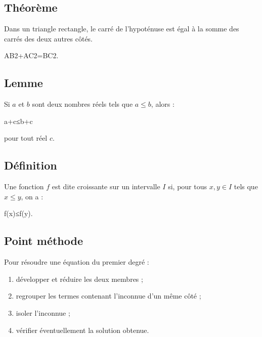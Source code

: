 \subsection{Théorème}

\begin{theoremebox}
Dans un triangle rectangle, le carré de l'hypoténuse est égal à la somme des carrés des deux autres côtés.

AB2+AC2=BC2.

\end{theoremebox}


\subsection{Lemme}

\begin{lemmabox}
Si $a$ et $b$ sont deux nombres réels tels que $a \leq b$, alors :

a+c≤b+c

pour tout réel $c$.
\end{lemmabox}


\subsection{Définition}

\begin{definitionbox}
Une fonction $f$ est dite croissante sur un intervalle $I$ si, pour tous
$x,y \in I$ tels que $x \leq y$, on a :

f(x)≤f(y).

\end{definitionbox}


\subsection{Point méthode}

\begin{methodebox}
Pour résoudre une équation du premier degré :
\begin{enumerate}
\item développer et réduire les deux membres ;
\item regrouper les termes contenant l'inconnue d'un même côté ;
\item isoler l'inconnue ;
\item vérifier éventuellement la solution obtenue.
\end{enumerate}
\end{methodebox}

